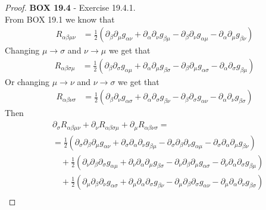 \documentclass[11pt]{article}
\theoremstyle{definition}
\begin{document}
\cleardoublepage
\begin{proof}{\textbf{BOX 19.4} - Exercise 19.4.1.}\\
From BOX 19.1 we know that 
\begin{align*}
    R_{\alpha\beta\mu\nu} &= \frac{1}{2}(
    \partial_{\beta}\partial_{\mu}g_{\alpha\nu}
    + \partial_{\alpha}\partial_{\nu}g_{\beta\mu}
    - \partial_{\beta}\partial_{\nu}g_{\alpha\mu}
    - \partial_{\alpha}\partial_{\mu}g_{\beta\nu})
\end{align*}
Changing $\mu\to\sigma$ and $\nu\to\mu$ we get that
\begin{align*}
    R_{\alpha\beta\sigma\mu} &= \frac{1}{2}(
        \partial_{\beta}\partial_{\sigma}g_{\alpha\mu}
        + \partial_{\alpha}\partial_{\mu}g_{\beta\sigma}
        - \partial_{\beta}\partial_{\mu}g_{\alpha\sigma}
        - \partial_{\alpha}\partial_{\sigma}g_{\beta\mu})
\end{align*}
Or changing $\mu\to\nu$ and $\nu\to\sigma$ we get that
\begin{align*}
    R_{\alpha\beta\nu\sigma} &= \frac{1}{2}(
    \partial_{\beta}\partial_{\nu}g_{\alpha\sigma}
    + \partial_{\alpha}\partial_{\sigma}g_{\beta\nu}
    - \partial_{\beta}\partial_{\sigma}g_{\alpha\nu}
    - \partial_{\alpha}\partial_{\nu}g_{\beta\sigma})
\end{align*}
Then
\begin{align*}
    &\partial_{\sigma} R_{\alpha\beta\mu\nu}
    + \partial_{\nu} R_{\alpha\beta\sigma\mu} 
    + \partial_{\mu} R_{\alpha\beta\nu\sigma} =\\
    &=\frac{1}{2}(
    \partial_{\sigma}\partial_{\beta}\partial_{\mu}g_{\alpha\nu}
    + \partial_{\sigma}\partial_{\alpha}\partial_{\nu}g_{\beta\mu}
    - \partial_{\sigma}\partial_{\beta}\partial_{\nu}g_{\alpha\mu}
    - \partial_{\sigma}\partial_{\alpha}\partial_{\mu}g_{\beta\nu})\\
    &\quad + \frac{1}{2}(
    \partial_{\nu}\partial_{\beta}\partial_{\sigma}g_{\alpha\mu}
    + \partial_{\nu}\partial_{\alpha}\partial_{\mu}g_{\beta\sigma}
    - \partial_{\nu}\partial_{\beta}\partial_{\mu}g_{\alpha\sigma}
    - \partial_{\nu}\partial_{\alpha}\partial_{\sigma}g_{\beta\mu})\\
    &\quad + \frac{1}{2}(
    \partial_{\mu}\partial_{\beta}\partial_{\nu}g_{\alpha\sigma}
    + \partial_{\mu}\partial_{\alpha}\partial_{\sigma}g_{\beta\nu}
    - \partial_{\mu}\partial_{\beta}\partial_{\sigma}g_{\alpha\nu}
    - \partial_{\mu}\partial_{\alpha}\partial_{\nu}g_{\beta\sigma})\\

\end{align*}
\end{proof}
\end{document}
